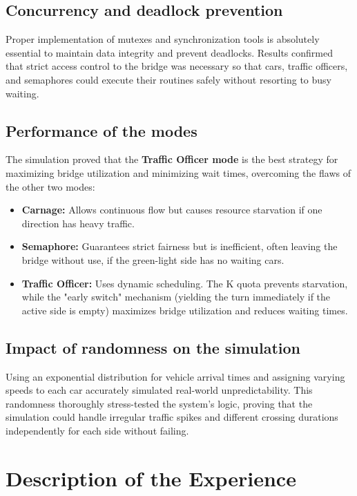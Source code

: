 \documentclass[12pt]{article}
\begin{document}
\subsection{Concurrency and deadlock prevention}
Proper implementation of mutexes and synchronization tools is absolutely essential to maintain data integrity and prevent deadlocks. Results confirmed that strict access control to the bridge was necessary so that cars, traffic officers, and semaphores could execute their routines safely without resorting to busy waiting.
\subsection{Performance of the modes}
The simulation proved that the \textbf{Traffic Officer mode} is the best strategy for maximizing bridge utilization and minimizing wait times, overcoming the flaws of the other two modes:
\begin{itemize}
    \item \textbf{Carnage:} Allows continuous flow but causes resource starvation if one direction has heavy traffic.
    \item \textbf{Semaphore:} Guarantees strict fairness but is inefficient, often leaving the bridge without use, if the green-light side has no waiting cars.
    \item \textbf{Traffic Officer:} Uses dynamic scheduling. The K quota prevents starvation, while the "early switch" mechanism (yielding the turn immediately if the active side is empty) maximizes bridge utilization and reduces waiting times.
\end{itemize}
\subsection{Impact of randomness on the simulation}
Using an exponential distribution for vehicle arrival times and assigning varying speeds to each car accurately simulated real-world unpredictability. This randomness thoroughly stress-tested the system's logic, proving that the simulation could handle irregular traffic spikes and different crossing durations independently for each side without failing.

\section{Description of the Experience}
\end{document}
